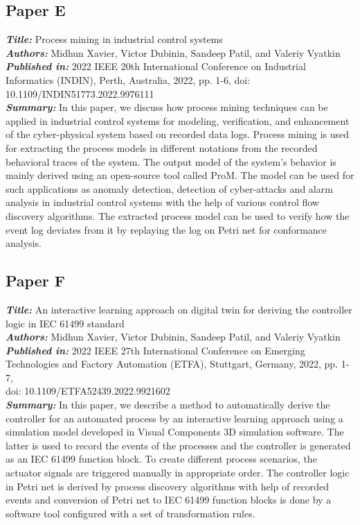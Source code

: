 \subsection{Paper E}
\textbf{\textit{Title:}} Process mining in industrial control systems\\
\textbf{\textit{Authors:}} Midhun Xavier, Victor Dubinin, Sandeep Patil, and Valeriy Vyatkin\\
\textbf{\textit{Published in:}} 2022 IEEE 20th International Conference on Industrial Informatics (INDIN), Perth, Australia, 2022, pp. 1-6, doi: 10.1109/INDIN51773.2022.9976111\\
\textbf{\textit{Summary:}} In this paper, we discuss how process mining techniques can be applied in industrial control systems for modeling, verification, and enhancement of the cyber-physical system based on recorded data logs. Process mining is used for extracting the process models in different notations from the recorded behavioral traces of the system. The output model of the system's behavior is mainly derived using an open-source tool called ProM. The model can be used for such applications as anomaly detection, detection of cyber-attacks and alarm analysis in industrial control systems with the help of various control flow discovery algorithms. The extracted process model can be used to verify how the event log deviates from it by replaying the log on Petri net for conformance analysis.\\

\subsection{Paper F}
\textbf{\textit{Title:}} An interactive learning approach on digital twin for deriving the controller logic in IEC 61499 standard\\
\textbf{\textit{Authors:}} Midhun Xavier, Victor Dubinin, Sandeep Patil, and Valeriy Vyatkin\\
\textbf{\textit{Published in:}} 2022 IEEE 27th International Conference on Emerging Technologies and Factory Automation (ETFA), Stuttgart, Germany, 2022, pp. 1-7,\\ doi: 10.1109/ETFA52439.2022.9921602\\
\textbf{\textit{Summary:}} In this paper, we describe a method to automatically derive the controller for an automated process by an interactive learning approach using a simulation model developed in Visual Components 3D simulation software. The latter is used to record the events of the processes and the controller is generated as an IEC 61499 function block. To create different process scenarios, the actuator signals are triggered manually in appropriate order. The controller logic in Petri net is derived by process discovery algorithms with help of recorded events and conversion of Petri net to IEC 61499 function blocks is done by a software tool configured with a set of transformation rules.\\

